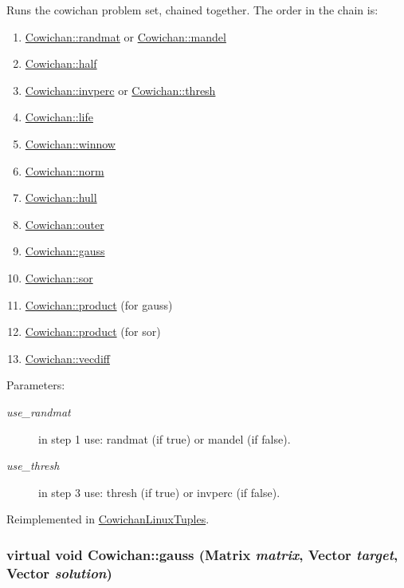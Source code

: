 Runs the cowichan problem set, chained together. The order in the chain is: \begin{enumerate}
\item \hyperlink{class_cowichan_c44cacf9d9e363a5b076bcee8b9a7a73}{Cowichan::randmat} or \hyperlink{class_cowichan_ec6cc4eb2ad444474b923532167e98a2}{Cowichan::mandel} \item \hyperlink{class_cowichan_308603053675bccbe631f04af921f57c}{Cowichan::half} \item \hyperlink{class_cowichan_ea126792a31e54a8722663b7ea768955}{Cowichan::invperc} or \hyperlink{class_cowichan_a0b633b8c1f21884e0998a9c7020c08c}{Cowichan::thresh} \item \hyperlink{class_cowichan_d449595ef2fe934bdd128ac8b1f51d07}{Cowichan::life} \item \hyperlink{class_cowichan_13d60e06ced3b5da79d62c133ce82337}{Cowichan::winnow} \item \hyperlink{class_cowichan_3df21e3c627958114e045c3559a29f30}{Cowichan::norm} \item \hyperlink{class_cowichan_0c6b68ae3c059b66893405f8530a2e0a}{Cowichan::hull} \item \hyperlink{class_cowichan_52f17221019290b88334b0ca7f3bcdb9}{Cowichan::outer} \item \hyperlink{class_cowichan_aa9aac74b96dc5ed33e821d94649d1b2}{Cowichan::gauss} \item \hyperlink{class_cowichan_92d8d9ae77208115fdfe69e1174f601c}{Cowichan::sor} \item \hyperlink{class_cowichan_3d7d4b581a1d6f0392dc452830fb3b03}{Cowichan::product} (for gauss) \item \hyperlink{class_cowichan_3d7d4b581a1d6f0392dc452830fb3b03}{Cowichan::product} (for sor) \item \hyperlink{class_cowichan_775d72b5e7d122f9f32555352278250e}{Cowichan::vecdiff} \end{enumerate}
\begin{Desc}
\item[Parameters:]
\begin{description}
\item[{\em use\_\-randmat}]in step 1 use: randmat (if true) or mandel (if false). \item[{\em use\_\-thresh}]in step 3 use: thresh (if true) or invperc (if false). \end{description}
\end{Desc}


Reimplemented in \hyperlink{class_cowichan_linux_tuples_fd49b2a0af64bafb93a5fe1210c68acd}{CowichanLinuxTuples}.\hypertarget{class_cowichan_aa9aac74b96dc5ed33e821d94649d1b2}{
\subsubsection[{gauss}]{\setlength{\rightskip}{0pt plus 5cm}virtual void Cowichan::gauss ({\bf Matrix} {\em matrix}, \/  {\bf Vector} {\em target}, \/  {\bf Vector} {\em solution})}}
\label{class_cowichan_aa9aac74b96dc5ed33e821d94649d1b2}


